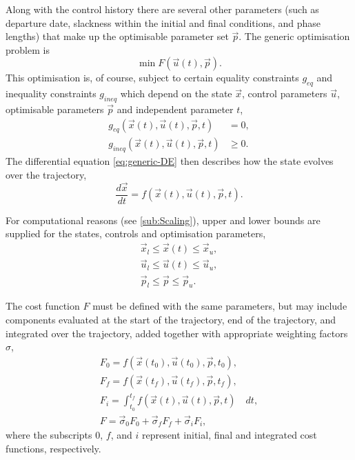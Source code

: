 Along with the control history there are several other parameters (such as departure date, slackness within the initial and final conditions, and phase lengths) that make up the optimisable parameter set $\vec{p}$. The generic optimisation problem is
\begin{equation} \label{eq:Optimisation}
\min F(\vec{u}(t),\vec{p}).
\end{equation}
This optimisation is, of course, subject to certain equality constraints $g_{eq}$ and inequality constraints $g_{ineq}$ which depend on the state $\vec{x}$, control parameters $\vec{u}$, optimisable parameters $\vec{p}$ and independent parameter $t$, 
\begin{subequations} \label{eq:Constraints}
\begin{align}
g_{eq}(\vec{x}(t),\vec{u}(t),\vec{p},t) &= 0, \\
g_{ineq}(\vec{x}(t),\vec{u}(t),\vec{p},t) &\ge 0.
\end{align}
\end{subequations}
The differential equation \eqref{eq:generic-DE} then describes how the state evolves over the trajectory,
\begin{equation}\label{eq:generic-DE}
\frac{d\vec{x}}{dt} = f(\vec{x}(t),\vec{u}(t),\vec{p},t).
\end{equation}

For computational reasons (see \autoref{sub:Scaling}), upper and lower bounds are supplied for the states, controls and optimisation parameters,
\begin{subequations} \label{eq:Bounds}
\begin{gather}
\vec{x}_l\le\vec{x}(t)\le\vec{x}_u \label{eq:state-bounds}, \\
\vec{u}_l\le\vec{u}(t)\le\vec{u}_u \label{eq:control-bounds}, \\
\vec{p}_l\le\vec{p}\le\vec{p}_u \label{eq:parameter-bounds}.
\end{gather}
\end{subequations}

The cost function $F$ must be defined with the same parameters, but may include components evaluated at the start of the trajectory, end of the trajectory, and integrated over the trajectory, added together with appropriate weighting factors $\sigma$,
\begin{subequations} \label{eq:cost-function}
\begin{gather}
F_0=f(\vec{x}(t_0),\vec{u}(t_0),\vec{p},t_0) \label{eq:init-cost}, \\
F_f=f(\vec{x}(t_f),\vec{u}(t_f),\vec{p},t_f) \label{eq:final-cost}, \\
F_i=\int^{t_f}_{t_0}f(\vec{x}(t),\vec{u}(t),\vec{p},t)\quad dt \label{eq:integral-cost}, \\
F = \vec\sigma_0 F_0+\vec\sigma_f F_f+\vec\sigma_i F_i \label{eq:total-cost},
\end{gather}
\end{subequations}
where the subscripts $0$, $f$, and $i$ represent initial, final and integrated cost functions, respectively.


